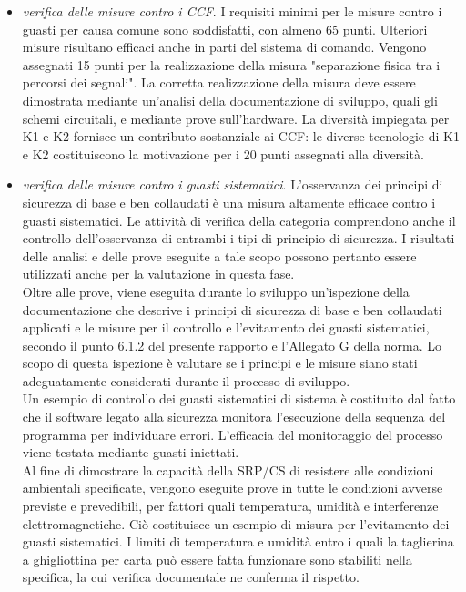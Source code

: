 \begin{itemize}
    \item \textit{verifica delle misure contro i CCF}. I requisiti minimi per le misure contro i guasti per causa comune sono soddisfatti, con almeno 65 punti. Ulteriori misure risultano efficaci anche in parti del sistema di comando. Vengono assegnati 15 punti per la realizzazione della misura "separazione fisica tra i percorsi dei segnali". La corretta realizzazione della misura deve essere dimostrata mediante un'analisi della documentazione di sviluppo, quali gli schemi circuitali, e mediante prove sull'hardware. La diversità impiegata per K1 e K2 fornisce un contributo sostanziale ai CCF: le diverse tecnologie di K1 e K2 costituiscono la motivazione per i 20 punti assegnati alla diversità.
    \item \textit{verifica delle misure contro i guasti sistematici}. L'osservanza dei principi di sicurezza di base e ben collaudati è una misura altamente efficace contro i guasti sistematici. Le attività di verifica della categoria comprendono anche il controllo dell'osservanza di entrambi i tipi di principio di sicurezza. I risultati delle analisi e delle prove eseguite a tale scopo possono pertanto essere utilizzati anche per la valutazione in questa fase.\\
    Oltre alle prove, viene eseguita durante lo sviluppo un'ispezione della documentazione che descrive i principi di sicurezza di base e ben collaudati applicati e le misure per il controllo e l'evitamento dei guasti sistematici, secondo il punto 6.1.2 del presente rapporto e l'Allegato G della norma. Lo scopo di questa ispezione è valutare se i principi e le misure siano stati adeguatamente considerati durante il processo di sviluppo.\\
    Un esempio di controllo dei guasti sistematici di sistema è costituito dal fatto che il software legato alla sicurezza monitora l'esecuzione della sequenza del programma per individuare errori. L'efficacia del monitoraggio del processo viene testata mediante guasti iniettati.\\
    Al fine di dimostrare la capacità della SRP/CS di resistere alle condizioni ambientali specificate, vengono eseguite prove in tutte le condizioni avverse previste e prevedibili, per fattori quali temperatura, umidità e interferenze elettromagnetiche. Ciò costituisce un esempio di misura per l'evitamento dei guasti sistematici. I limiti di temperatura e umidità entro i quali la taglierina a ghigliottina per carta può essere fatta funzionare sono stabiliti nella specifica, la cui verifica documentale ne conferma il rispetto.

\end{itemize}
